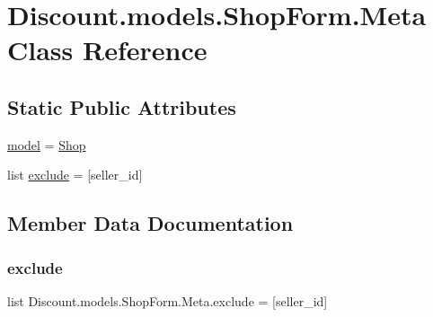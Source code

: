 \hypertarget{class_discount_1_1models_1_1_shop_form_1_1_meta}{}\section{Discount.\+models.\+Shop\+Form.\+Meta Class Reference}
\label{class_discount_1_1models_1_1_shop_form_1_1_meta}
\subsection*{Static Public Attributes}
\begin{DoxyCompactItemize}
\item 
\hyperlink{class_discount_1_1models_1_1_shop_form_1_1_meta_a837c3c2e526f40ac5ddbbb8c953b8f87}{model} = \hyperlink{class_discount_1_1models_1_1_shop}{Shop}
\item 
list \hyperlink{class_discount_1_1models_1_1_shop_form_1_1_meta_abbc67e8cd37a81328af5364facc74489}{exclude} = \mbox{[}\textquotesingle{}seller\+\_\+id\textquotesingle{}\mbox{]}
\end{DoxyCompactItemize}


\subsection{Member Data Documentation}
\mbox{\label{class_discount_1_1models_1_1_shop_form_1_1_meta_abbc67e8cd37a81328af5364facc74489}} 
\subsubsection{\texorpdfstring{exclude}{exclude}}
{\footnotesize\ttfamily list Discount.\+models.\+Shop\+Form.\+Meta.\+exclude = \mbox{[}\textquotesingle{}seller\+\_\+id\textquotesingle{}\mbox{]}\hspace{0.3cm}{\ttfamily [static]}}

\mbox{\label{class_discount_1_1models_1_1_shop_form_1_1_meta_a837c3c2e526f40ac5ddbbb8c953b8f87}} 
